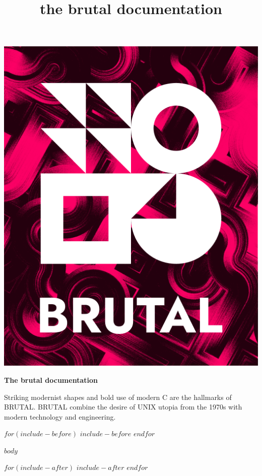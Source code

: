 \documentclass{book}
\title{\bigskip \bigskip the brutal documentation}
\begin{document}
    \begin{titlepage}
        \centering
        \includegraphics[scale=0.5]{../book/shared/logo.png}

        \vfill

        {\bfseries\Large
            The brutal documentation\\  
        }

        Striking modernist shapes and bold use of modern C are the hallmarks of BRUTAL.
        BRUTAL combine the desire of UNIX utopia from the 1970s with modern technology and engineering.
    \end{titlepage}

    \tableofcontents

    \newpage

$for(include-before)$
$include-before$
$endfor$

$body$

$for(include-after)$
$include-after$
$endfor$
\end{document}
